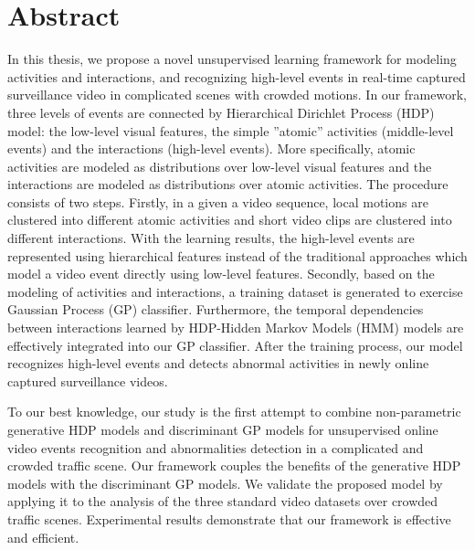 \chapter*{Abstract}
\label{chap:Abstract}
\setcounter{page}{1}
In this thesis, we propose a novel unsupervised learning framework for modeling activities and interactions, and recognizing high-level events in real-time captured surveillance video in complicated scenes with crowded motions.
In our framework, three levels of events are connected by Hierarchical Dirichlet Process (HDP) model: the low-level visual features,  the simple ''atomic'' activities (middle-level events) and the interactions (high-level events). 
More specifically, atomic activities are modeled as distributions over low-level visual features and the interactions are modeled as distributions over atomic activities. 
The procedure consists of two steps.
Firstly, in a given a video sequence, local motions are clustered into different atomic activities and short video clips are clustered into different interactions.
With the learning results, the high-level events are represented using hierarchical features instead of the traditional approaches which model a video event directly using low-level features. 
Secondly, based on the modeling of activities and interactions, a training dataset is generated to exercise Gaussian Process (GP) classifier.
Furthermore, the temporal dependencies between interactions learned by HDP-Hidden Markov Models (HMM) models are effectively integrated into our GP classifier.
After the training process, our model recognizes high-level events and detects abnormal activities in newly online captured surveillance videos.

To our best knowledge, our study is the first attempt to combine non-parametric generative HDP models and discriminant GP models for unsupervised online video events recognition and abnormalities detection in a complicated and crowded traffic scene. 
Our framework couples the benefits of the generative HDP models with the discriminant GP models.
We validate the proposed model by applying it to the analysis of the three standard video datasets over crowded traffic scenes. Experimental results demonstrate that our framework is effective and efficient.


